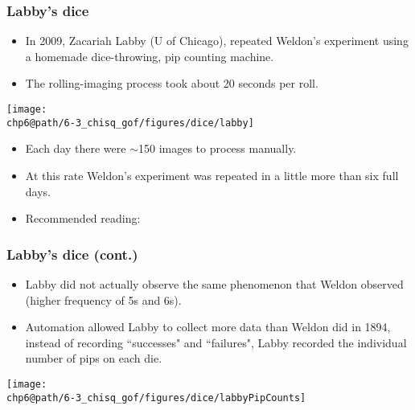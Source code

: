 \documentclass[slidestop,compress,mathserif]{beamer}
\makeatletter
\def\chp6@path{../../Chp 6}
\makeatother
\begin{document}
\begin{frame}
\frametitle{Labby's dice}

{
\begin{itemize}

\item In 2009, Zacariah Labby (U of Chicago), repeated Weldon's experiment using a homemade dice-throwing, pip counting machine.
\begin{center}
\end{center}

\item The rolling-imaging process took about 20 seconds per roll.

\end{itemize}
}
{
\begin{center}
\texttt{[image: \\chp6@path/6-3\_chisq\_gof/figures/dice/labby]}
\end{center}
}

\begin{itemize}

\item Each day there were $\sim$150 images to process manually.

\item At this rate Weldon's experiment was repeated in a little more than six full days.

\item Recommended reading: 

\end{itemize}

\end{frame}


\begin{frame}
\frametitle{Labby's dice (cont.)}

\begin{itemize}

\item Labby did not actually observe the same phenomenon that Weldon observed (higher frequency of 5s and 6s).

\item Automation allowed Labby to collect more data than Weldon did in 1894, instead of recording ``successes" and ``failures", Labby recorded the individual number of pips on each die.

\end{itemize}

\begin{center}
\texttt{[image: \\chp6@path/6-3\_chisq\_gof/figures/dice/labbyPipCounts]}
\end{center}

\end{frame}
\end{document}
